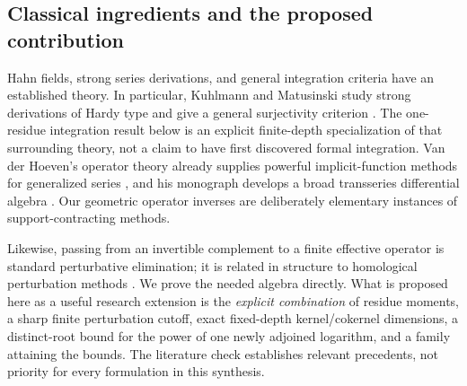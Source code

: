 \documentclass[11pt,a4paper]{article}
\numberwithin{equation}{section}
\theoremstyle{definition}
\theoremstyle{remark}
\begin{document}
\subsection{Classical ingredients and the proposed contribution}
Hahn fields, strong series derivations, and general integration criteria have an established theory. In particular, Kuhlmann and Matusinski study strong derivations of Hardy type and give a general surjectivity criterion \cite{km2012}. The one-residue integration result below is an explicit finite-depth specialization of that surrounding theory, not a claim to have first discovered formal integration. Van der Hoeven's operator theory already supplies powerful implicit-function methods for generalized series \cite{vdh2001}, and his monograph develops a broad transseries differential algebra \cite{vdh2006}. Our geometric operator inverses are deliberately elementary instances of support-contracting methods.

Likewise, passing from an invertible complement to a finite effective operator is standard perturbative elimination; it is related in structure to homological perturbation methods \cite{hogancamp}. We prove the needed algebra directly. What is proposed here as a useful research extension is the \emph{explicit combination} of residue moments, a sharp finite perturbation cutoff, exact fixed-depth kernel/cokernel dimensions, a distinct-root bound for the power of one newly adjoined logarithm, and a family attaining the bounds. The literature check establishes relevant precedents, not priority for every formulation in this synthesis.
\end{document}
